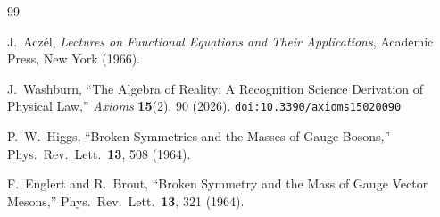 \documentclass[12pt,a4paper]{article}
\theoremstyle{definition}
\theoremstyle{remark}
\begin{document}
\begin{thebibliography}{99}

J.~Acz\'el, \emph{Lectures on Functional Equations and Their Applications},
Academic Press, New York (1966).

J.~Washburn, ``The Algebra of Reality: A Recognition Science Derivation
of Physical Law,'' \emph{Axioms} \textbf{15}(2), 90 (2026).
\texttt{doi:10.3390/axioms15020090}

P.~W.~Higgs, ``Broken Symmetries and the Masses of Gauge Bosons,''
Phys.\ Rev.\ Lett.\ \textbf{13}, 508 (1964).

F.~Englert and R.~Brout, ``Broken Symmetry and the Mass of Gauge
Vector Mesons,'' Phys.\ Rev.\ Lett.\ \textbf{13}, 321 (1964).

\end{thebibliography}
\end{document}
